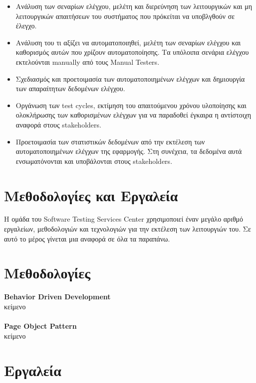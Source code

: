 \begin{itemize}
    \item Ανάλυση των σεναρίων ελέγχου, μελέτη και διερεύνηση των λειτουργικών και μη λειτουργικών απαιτήσεων του συστήματος που πρόκείται να υποβλγθούν σε έλεγχο.
    \item Ανάλυση του τι αξίζει να αυτοματοποιηθεί, μελέτη των σεναρίων ελέγχου και καθορισμός αυτών που χρίζουν αυτοματοποίησης. Τα υπόλοιπα σενάρια ελέγχου εκτελούνται \textlatin{manually} από τους \textlatin{Manual Testers}.
    \item Σχεδιασμός και προετοιμασία των αυτοματοποιημένων ελέγχων και δημιουργία των απαραίτητων δεδομένων ελέγχου.
    \item Οργάνωση των \textlatin{test cycles}, εκτίμηση του απαιτούμενου χρόνου υλοποίησης και ολοκλήρωσης των καθορισμένων ελέγχων για να παραδοθεί έγκαιρα η αντίστοιχη αναφορά στους \textlatin{stakeholders}.
    \item Προετοιμασία των στατιστικών δεδομένων από την εκτέλεση των αυτοματοποιημένων ελέγχων της εφαρμογής. Στη συνέχεια, τα δεδομένα αυτά ενσωματόνονται και υποβάλονται στους \textlatin{stakeholders}.
\end{itemize}

\section*{Μεθοδολογίες και Εργαλεία}

Η ομάδα του \textlatin{Software Testing Services Center} χρησιμοποιεί έναν μεγάλο αριθμό εργαλείων, μεθοδολογιών και τεχνολογιών για την εκτέλεση των λειτουργιών του. Σε αυτό το μέρος γίνεται μια αναφορά σε όλα τα παραπάνω.\\

\section*{Μεθοδολογίες}
\textbf{\textlatin{Behavior Driven Development}}\\
κείμενο\\ \\
\textbf{\textlatin{Page Object Pattern}}\\
κείμενο\\
\section*{Εργαλεία}

